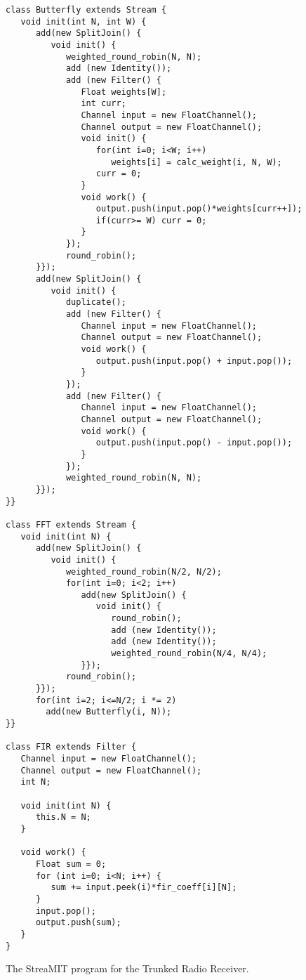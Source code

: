 \begin{figure}[t]
\scriptsize
\begin{verbatim}
class Butterfly extends Stream {
   void init(int N, int W) {
      add(new SplitJoin() {
         void init() {
            weighted_round_robin(N, N);
            add (new Identity());
            add (new Filter() {
               Float weights[W];
               int curr;
               Channel input = new FloatChannel();
               Channel output = new FloatChannel();
               void init() {
                  for(int i=0; i<W; i++)
                     weights[i] = calc_weight(i, N, W);
                  curr = 0;
               }
               void work() {
                  output.push(input.pop()*weights[curr++]);
                  if(curr>= W) curr = 0;
               }    
            });
            round_robin();
      }});
      add(new SplitJoin() {
         void init() {
            duplicate();
            add (new Filter() {   
               Channel input = new FloatChannel();
               Channel output = new FloatChannel();
               void work() {
                  output.push(input.pop() + input.pop());
               }
            });
            add (new Filter() {   
               Channel input = new FloatChannel();
               Channel output = new FloatChannel();
               void work() {
                  output.push(input.pop() - input.pop());
               }
            });
            weighted_round_robin(N, N);
      }});
}}

class FFT extends Stream {
   void init(int N) {
      add(new SplitJoin() {
         void init() {
            weighted_round_robin(N/2, N/2);
            for(int i=0; i<2; i++) 
               add(new SplitJoin() {
                  void init() {
                     round_robin();
                     add (new Identity());
                     add (new Identity());
                     weighted_round_robin(N/4, N/4);
               }});
            round_robin();
      }});
      for(int i=2; i<=N/2; i *= 2)
        add(new Butterfly(i, N));
}}

class FIR extends Filter {
   Channel input = new FloatChannel();
   Channel output = new FloatChannel();           
   int N;

   void init(int N) {
      this.N = N;
   }

   void work() {
      Float sum = 0;
      for (int i=0; i<N; i++) {
         sum += input.peek(i)*fir_coeff[i][N];
      }
      input.pop();
      output.push(sum);
   }
}
\end{verbatim}
\vspace{-12pt}
\caption{\protect\small The StreaMIT program for the Trunked Radio Receiver.
\protect\label{fig:radiocode}}
\vspace{-12pt}
\end{figure}

